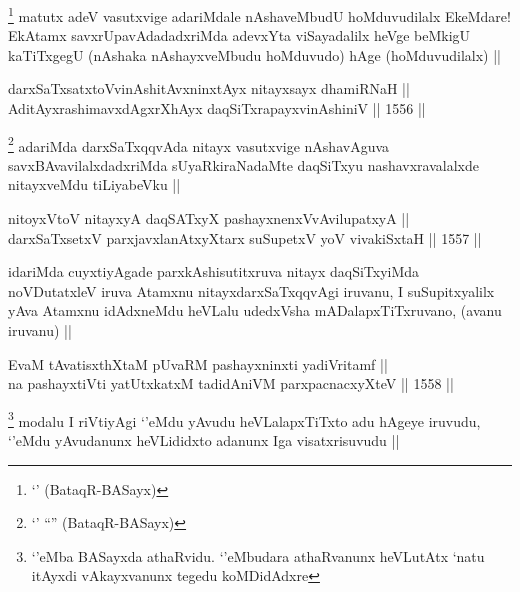 \begin{artha}
\footnote{`\stext' (BataqR-BASayx)}
matutx adeV vasutxvige adariMdale nAshaveMbudU hoMduvudilalx EkeMdare! EkAtamx savxrUpavAdadadxriMda adevxYta viSayadalilx heVge beMkigU kaTiTxgegU (nAshaka nAshayxveMbudu hoMduvudo) hAge (hoMduvudilalx) ||
\end{artha}


\begin{shl}
darxSaTxsatxtoV\s vinAshitAvxninxtAyx nitayxsayx dhamiRNaH ||  \\
AditAyxrashimavxdAgxrXhAyx daqSiTxrapayxvinAshiniV ||  1556 ||  
\end{shl}

\begin{artha}
\footnote{`\stext' ``\stext'' (BataqR-BASayx)}
adariMda darxSaTxqqvAda nitayx vasutxvige nAshavAguva savxBAvavilalxdadxriMda sUyaRkiraNadaMte daqSiTxyu nashavxravalalxde nitayxveMdu tiLiyabeVku ||
\end{artha}


\begin{shl}
nitoyxV\s toV nitayxyA daqSATxyX pashayxnenxVvAvilupatxyA || \\
darxSaTx\s \s setxV parxjavxlanAtxyX\s tarx suSupetxV yoV vivakiSxtaH ||  1557 ||  
\end{shl}

\begin{artha}
idariMda cuyxtiyAgade parxkAshisutitxruva nitayx daqSiTxyiMda noVDutatxleV iruva Atamxnu nitayxdarxSaTxqqvAgi iruvanu, I suSupitxyalilx yAva Atamxnu idAdxneMdu heVLalu udedxVsha mADalapxTiTxruvano, (avanu iruvanu) ||
\end{artha}


\begin{shl}
EvaM tAvatisxthXtaM pUvaRM pashayxninxti yadiVritamf || \\
na pashayxtiVti yatUtxkatxM tadidAniVM parxpacnacxyXteV ||  1558 ||  
\end{shl}

\begin{artha}
\footnote{`\stext'eMba BASayxda athaRvidu. `\stext'eMbudara athaRvanunx heVLutAtx `natu itAyxdi vAkayxvanunx tegedu koMDidAdxre}
modalu I riVtiyAgi `\stext'eMdu yAvudu heVLalapxTiTxto adu hAgeye iruvudu, `\stext'eMdu yAvudanunx heVLididxto adanunx Iga visatxrisuvudu ||
\end{artha}

